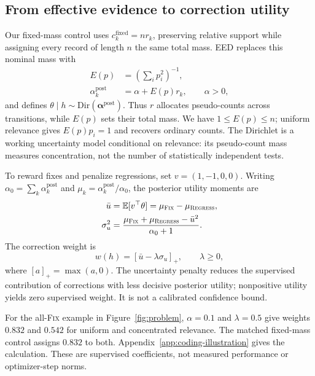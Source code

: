 \documentclass{article}
\newcommand{\eed}{\textsc{EED}\xspace}
\newcommand{\fix}{\textsc{Fix}\xspace}
\newcommand{\regress}{\textsc{Regress}\xspace}
\newcommand{\E}{\mathbb{E}}
\begin{document}
\subsection{From effective evidence to correction utility}

Our fixed-mass control uses $c_k^{\mathrm{fixed}}=nr_k$, preserving relative support while assigning every record of length $n$ the same total mass. \eed replaces this nominal mass with
\begin{align}
E(p) &= \left(\sum_i p_i^2\right)^{-1},
\label{eq:effective-evidence}\\
\alpha_k^{\mathrm{post}} &= \alpha+E(p)r_k,
\qquad \alpha>0,
\label{eq:posterior}
\end{align}
and defines $\theta\mid h\sim\mathrm{Dir}(\boldsymbol\alpha^{\mathrm{post}})$. Thus $r$ allocates pseudo-counts across transitions, while $E(p)$ sets their total mass. We have $1\le E(p)\le n$; uniform relevance gives $E(p)p_i=1$ and recovers ordinary counts. The Dirichlet is a working uncertainty model conditional on relevance: its pseudo-count mass measures concentration, not the number of statistically independent tests.

To reward fixes and penalize regressions, set $v=(1,-1,0,0)$. Writing $\alpha_0=\sum_k\alpha_k^{\mathrm{post}}$ and $\mu_k=\alpha_k^{\mathrm{post}}/\alpha_0$, the posterior utility moments are
\begin{align}
\bar u &= \E[v^\top\theta]
=\mu_{\fix}-\mu_{\regress},
\label{eq:utility-mean}\\
\sigma_u^2 &=
\frac{\mu_{\fix}+\mu_{\regress}-\bar u^2}{\alpha_0+1}.
\label{eq:utility-variance}
\end{align}
The correction weight is
\begin{equation}
w(h)=\left[\bar u-\lambda\sigma_u\right]_+,
\qquad \lambda\ge0,
\label{eq:utility}
\end{equation}
where $[a]_+=\max(a,0)$. The uncertainty penalty reduces the supervised contribution of corrections with less decisive posterior utility; nonpositive utility yields zero supervised weight. It is not a calibrated confidence bound.

For the all-\fix example in Figure~\ref{fig:problem}, $\alpha=0.1$ and $\lambda=0.5$ give weights $0.832$ and $0.542$ for uniform and concentrated relevance. The matched fixed-mass control assigns $0.832$ to both. Appendix~\ref{app:coding-illustration} gives the calculation. These are supervised coefficients, not measured performance or optimizer-step norms.
\end{document}
